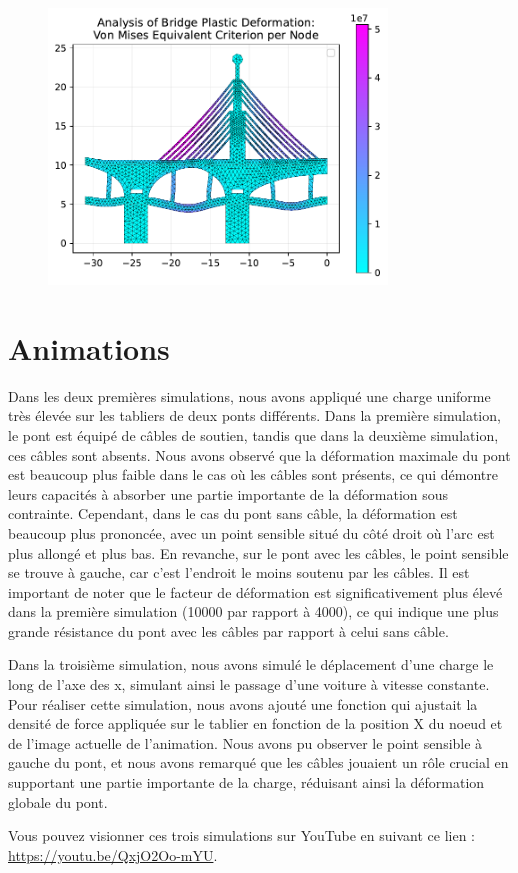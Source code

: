 \documentclass[conference]{IEEEtran}
\begin{document}
\begin{figure}[!htb]
    \centering
    \includegraphics[width=9cm]{Figures/maxConstrainBridge.pdf}
    \label{fig:maxConstrainsBridge}
\end{figure}

\section{Animations}

Dans les deux premières simulations, nous avons appliqué une charge uniforme très élevée sur les tabliers de deux ponts différents. Dans la première simulation, le pont est équipé de câbles de soutien, tandis que dans la deuxième simulation, ces câbles sont absents. Nous avons observé que la déformation maximale du pont est beaucoup plus faible dans le cas où les câbles sont présents, ce qui démontre leurs capacités à absorber une partie importante de la déformation sous contrainte. Cependant, dans le cas du pont sans câble, la déformation est beaucoup plus prononcée, avec un point sensible situé du côté droit où l'arc est plus allongé et plus bas. En revanche, sur le pont avec les câbles, le point sensible se trouve à gauche, car c'est l'endroit le moins soutenu par les câbles. Il est important de noter que le facteur de déformation est significativement plus élevé dans la première simulation (10000 par rapport à 4000), ce qui indique une plus grande résistance du pont avec les câbles par rapport à celui sans câble.

Dans la troisième simulation, nous avons simulé le déplacement d'une charge le long de l'axe des x, simulant ainsi le passage d'une voiture à vitesse constante. Pour réaliser cette simulation, nous avons ajouté une fonction qui ajustait la densité de force appliquée sur le tablier en fonction de la position X du noeud et de l'image actuelle de l'animation. Nous avons pu observer le point sensible à gauche du pont, et nous avons remarqué que les câbles jouaient un rôle crucial en supportant une partie importante de la charge, réduisant ainsi la déformation globale du pont.

Vous pouvez visionner ces trois simulations sur YouTube en suivant ce lien : \href{https://youtu.be/QxjO2Oo-mYU}{https://youtu.be/QxjO2Oo-mYU}.
\end{document}
